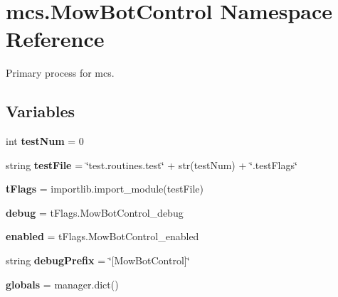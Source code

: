\hypertarget{namespacemcs_1_1MowBotControl}{}\section{mcs.\+Mow\+Bot\+Control Namespace Reference}
\label{namespacemcs_1_1MowBotControl}


Primary process for mcs.  


\subsection*{Variables}
\begin{DoxyCompactItemize}
\item 
\mbox{\label{namespacemcs_1_1MowBotControl_a5be92d87972fc62601434a1a0f2b5438}} 
int {\bfseries test\+Num} = 0
\item 
\mbox{\label{namespacemcs_1_1MowBotControl_af5d001d60dbe0d7091a45cb1e93d7cff}} 
string {\bfseries test\+File} = \char`\"{}test.\+routines.\+test\char`\"{} + str(test\+Num) + \char`\"{}.test\+Flags\char`\"{}
\item 
\mbox{\label{namespacemcs_1_1MowBotControl_a68d317fca30ee17dbe514198d1374bf6}} 
{\bfseries t\+Flags} = importlib.\+import\+\_\+module(test\+File)
\item 
\mbox{\label{namespacemcs_1_1MowBotControl_ad686b2af1a5e106508be06f4f69654bf}} 
{\bfseries debug} = t\+Flags.\+Mow\+Bot\+Control\+\_\+debug
\item 
\mbox{\label{namespacemcs_1_1MowBotControl_a76845ca20069eb0db438c1119ef5afef}} 
{\bfseries enabled} = t\+Flags.\+Mow\+Bot\+Control\+\_\+enabled
\item 
\mbox{\label{namespacemcs_1_1MowBotControl_abb4623bf23d3b97f276a7a19939b867f}} 
string {\bfseries debug\+Prefix} = \char`\"{}\mbox{[}Mow\+Bot\+Control\mbox{]}\char`\"{}
\item 
\mbox{\label{namespacemcs_1_1MowBotControl_a9c1cda98ccd610da39a4134b03254c40}} 
{\bfseries globals} = manager.\+dict()

\end{DoxyCompactItemize}
